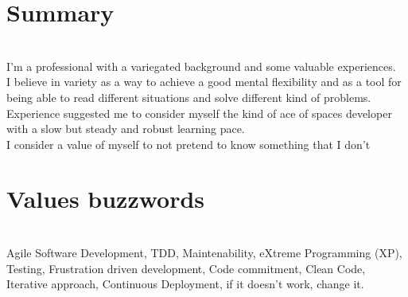 \documentclass[letterpaper]{twentysecondcv} %
\begin{document}

\section{Summary}\\
I'm a professional with a variegated background and some valuable experiences.\\
I believe in variety as a way to achieve a good mental flexibility and as a tool for being able to read different situations and solve different kind of problems.\\
Experience suggested me to consider myself the kind of ace of spaces developer with a slow but steady and robust learning pace.\\
I consider a value of myself to not pretend to know something that I don't\\


\section{Values buzzwords}\\
Agile Software Development, TDD, Maintenability, eXtreme Programming (XP), Testing, Frustration driven development, 
Code commitment, Clean Code, Iterative approach, Continuous Deployment, if it doesn't work, change it.








\end{document}
